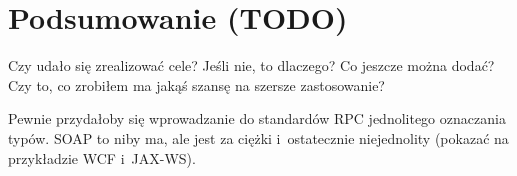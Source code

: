 \chapter{Podsumowanie (TODO)}
Czy udało się zrealizować cele? Jeśli nie, to dlaczego? Co jeszcze można dodać? Czy to, co zrobiłem ma jakąś szansę na szersze zastosowanie?

Pewnie przydałoby się wprowadzanie do standardów RPC jednolitego oznaczania typów. SOAP to niby ma, ale jest za ciężki i~ostatecznie niejednolity (pokazać na przykładzie WCF i~JAX-WS).

%

